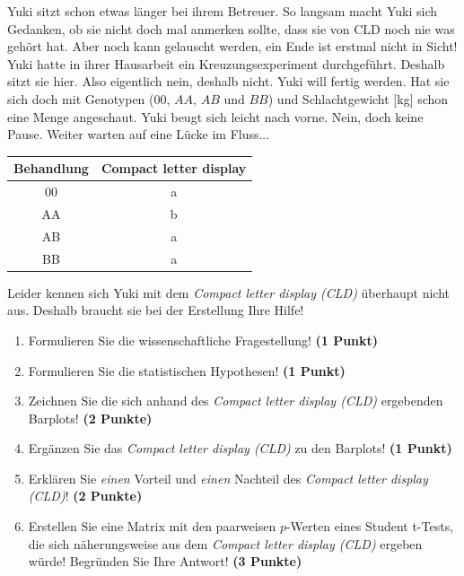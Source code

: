 \documentclass[a4paper, 9pt]{scrartcl}\usepackage[]{graphicx}\usepackage[]{xcolor}
\newenvironment{knitrout}{}{} %
\begin{document}
Yuki sitzt schon etwas länger bei ihrem Betreuer. So langsam macht Yuki sich Gedanken, ob sie nicht doch mal anmerken sollte, dass sie von CLD noch nie was gehört hat. Aber noch kann gelauscht werden, ein Ende ist erstmal nicht in Sicht! Yuki hatte in ihrer Hausarbeit ein Kreuzungsexperiment durchgeführt. Deshalb sitzt sie hier. Also eigentlich nein, deshalb nicht. Yuki will fertig werden. Hat sie sich doch mit Genotypen ($00$, $AA$, $AB$ und $BB$) und Schlachtgewicht [kg] schon eine Menge angeschaut. Yuki beugt sich leicht nach vorne. Nein, doch keine Pause. Weiter warten auf eine Lücke im Fluss...

\begin{knitrout}
\color{fgcolor}\begin{table}[!h]
\centering\begingroup\fontsize{10}{12}\selectfont

\begin{tabular}{cc}
\toprule
\textbf{Behandlung} & \textbf{Compact letter display}\\
\midrule
00 & a\\
AA & b\\
AB & a\\
BB & a\\
\bottomrule
\end{tabular}
\endgroup{}
\end{table}

\end{knitrout}

Leider kennen sich Yuki mit dem \textit{Compact letter display (CLD)} überhaupt nicht aus. Deshalb braucht sie bei der Erstellung Ihre Hilfe!

\begin{enumerate}
  \item Formulieren Sie die wissenschaftliche Fragestellung! \textbf{(1 Punkt)}
  \item Formulieren Sie die statistischen Hypothesen! \textbf{(1 Punkt)}
\item Zeichnen Sie die sich anhand des \textit{Compact letter display (CLD)} ergebenden Barplots! \textbf{(2 Punkte)}
\item Ergänzen Sie das \textit{Compact letter display (CLD)} zu den Barplots! \textbf{(1 Punkt)}
\item Erklären Sie \textit{einen} Vorteil und \textit{einen} Nachteil des \textit{Compact letter display (CLD)}! \textbf{(2 Punkte)}
\item Erstellen Sie eine Matrix mit den paarweisen $p$-Werten eines Student t-Tests, die sich näherungsweise aus dem \textit{Compact letter display (CLD)} ergeben würde! Begründen Sie Ihre Antwort! \textbf{(3 Punkte)}
\end{enumerate}
\end{document}
